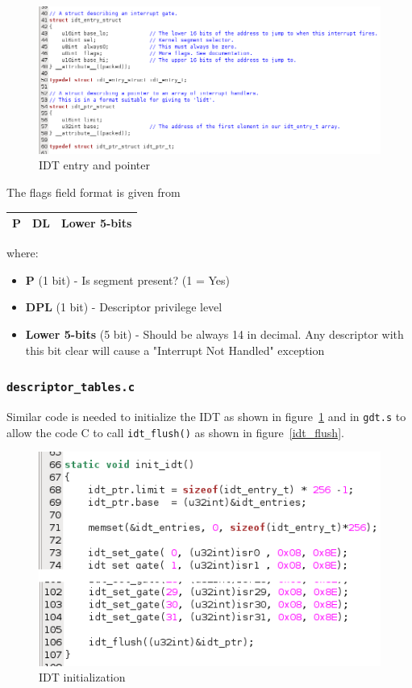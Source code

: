 \documentclass{report}
\begin{document}
\begin{figure}[hbtp]
\centering
\includegraphics[scale=0.36]{images/es02/idt_definitions.png}
\caption{IDT entry and pointer}
\end{figure}

The flags field format is given from 
\begin{center}
\begin{tabular}{|c|c|c|}
\hline 
P & DL & Lower 5-bits \\ 
\hline 
\end{tabular}
\end{center}
where:
\begin{itemize}
\item \textbf{P} (1 bit) - Is segment present? (1 = Yes)
\item \textbf{DPL} (1 bit) - Descriptor privilege level
\item \textbf{Lower 5-bits} (5 bit) - Should be always 14 in decimal. Any descriptor with this bit clear will cause a "Interrupt Not Handled" exception
\end{itemize}

\subsubsection*{\texttt{descriptor\_tables.c}}
Similar code is needed to initialize the IDT as shown in figure~\ref{idt_init} and in \texttt{gdt.s} to allow the code C to call \texttt{idt\_flush()} as shown in figure~\ref{idt_flush}.
\begin{figure}[hbtp]
\centering
\includegraphics[scale=0.5]{images/es02/idt_init.png}
\caption{IDT initialization}
\label{idt_init}
\end{figure}
\end{document}
